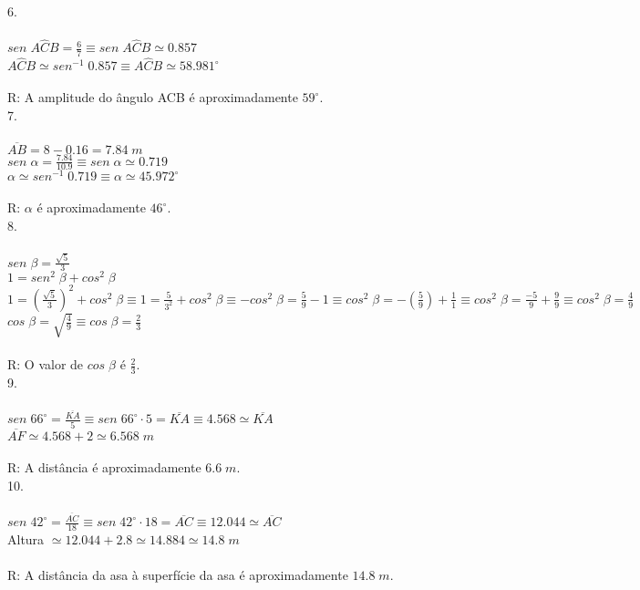 \documentclass[12pt]{article}
\begin{document}
6.\\\\
$sen\;A\hat{C}B=\frac{6}{7}\equiv sen\;A\hat{C}B\simeq0.857$\\
$A\hat{C}B\simeq sen^{-1}\;0.857\equiv A\hat{C}B\simeq58.981^{\circ}$\\\\
R: A amplitude do ângulo ACB é aproximadamente $59^{\circ}$.\\

7.\\\\
$\overline{AB}=8-0.16=7.84\;m$\\
$sen\;\alpha=\frac{7.84}{10.9}\equiv sen\;\alpha\simeq0.719$\\
$\alpha\simeq sen^{-1}\;0.719\equiv\alpha\simeq 45.972^{\circ}$\\\\
R: $\alpha$ é aproximadamente $46^{\circ}$.\\

8.\\\\
$sen\;\beta=\frac{\sqrt{5}}{3}$\\
$1=sen^2\;\beta+cos^2\;\beta$\\
$1=(\frac{\sqrt{5}}{3})^2+cos^2\;\beta\equiv1=\frac{5}{3^2}+cos^2\;\beta\equiv-cos^2\;\beta=\frac{5}{9}-1\equiv cos^2\;\beta=-(\frac{5}{9})+\frac{1}{1}\equiv cos^2\;\beta=\frac{-5}{9}+\frac{9}{9}\equiv cos^2\;\beta=\frac{4}{9}$\\
$cos\;\beta=\sqrt{\frac{4}{9}}\equiv cos\;\beta=\frac{2}{3}$\\\\
R: O valor de $cos\;\beta$ é $\frac{2}{3}$.\\

9.\\\\
$sen\;66^{\circ}=\frac{\overline{KA}}{5}\equiv sen\;66^{\circ}\cdot5=\overline{KA}\equiv4.568\simeq\overline{KA}$\\
$\overline{AF}\simeq4.568+2\simeq6.568\;m$\\\\
R: A distância é aproximadamente $6.6\;m$.\\

10.\\\\
$sen\;42^{\circ}=\frac{\overline{AC}}{18}\equiv sen\;42^{\circ}\cdot18=\overline{AC}\equiv12.044\simeq\overline{AC}$\\
Altura $\simeq12.044+2.8\simeq14.884\simeq14.8\;m$\\\\
R: A distância da asa à superfície da asa é aproximadamente $14.8\;m$.\\
\end{document}
